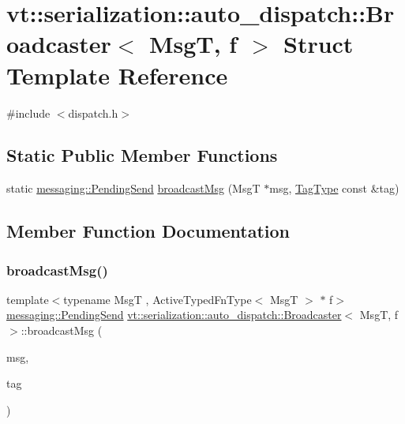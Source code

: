 \hypertarget{structvt_1_1serialization_1_1auto__dispatch_1_1_broadcaster}{}\section{vt\+:\+:serialization\+:\+:auto\+\_\+dispatch\+:\+:Broadcaster$<$ MsgT, f $>$ Struct Template Reference}
\label{structvt_1_1serialization_1_1auto__dispatch_1_1_broadcaster}


{\ttfamily \#include $<$dispatch.\+h$>$}

\subsection*{Static Public Member Functions}
\begin{DoxyCompactItemize}
\item 
static \hyperlink{structvt_1_1messaging_1_1_pending_send}{messaging\+::\+Pending\+Send} \hyperlink{structvt_1_1serialization_1_1auto__dispatch_1_1_broadcaster_a018303309d5de67427102de0cd87a69d}{broadcast\+Msg} (MsgT $\ast$msg, \hyperlink{namespacevt_a84ab281dae04a52a4b243d6bf62d0e52}{Tag\+Type} const \&tag)
\end{DoxyCompactItemize}


\subsection{Member Function Documentation}
\mbox{\label{structvt_1_1serialization_1_1auto__dispatch_1_1_broadcaster_a018303309d5de67427102de0cd87a69d}} 
\subsubsection{\texorpdfstring{broadcast\+Msg()}{broadcastMsg()}}
{\footnotesize\ttfamily template$<$typename MsgT , Active\+Typed\+Fn\+Type$<$ Msg\+T $>$ $\ast$ f$>$ \\
\hyperlink{structvt_1_1messaging_1_1_pending_send}{messaging\+::\+Pending\+Send} \hyperlink{structvt_1_1serialization_1_1auto__dispatch_1_1_broadcaster}{vt\+::serialization\+::auto\+\_\+dispatch\+::\+Broadcaster}$<$ MsgT, f $>$\+::broadcast\+Msg (\begin{DoxyParamCaption}\item[{MsgT $\ast$}]{msg,  }\item[{\hyperlink{namespacevt_a84ab281dae04a52a4b243d6bf62d0e52}{Tag\+Type} const \&}]{tag }\end{DoxyParamCaption})\hspace{0.3cm}{\ttfamily [static]}}



